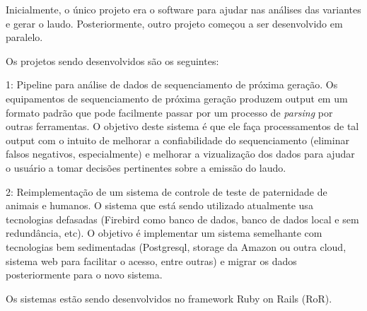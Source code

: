﻿Inicialmente, o único projeto era o software para ajudar nas análises das variantes e gerar o laudo. Posteriormente, outro projeto começou a ser desenvolvido
em paralelo.

Os projetos sendo desenvolvidos são os seguintes:

1: Pipeline para análise de dados de sequenciamento de próxima geração. Os equipamentos de sequenciamento de próxima geração produzem output em 
um formato padrão que pode facilmente passar por um processo de \textit{parsing} por outras ferramentas. O objetivo deste sistema é que ele 
faça processamentos de tal output com o intuito de melhorar a confiabilidade do sequenciamento (eliminar falsos negativos, especialmente) 
e melhorar a vizualização dos dados para ajudar o usuário a tomar decisões pertinentes sobre a emissão do laudo.

2: Reimplementação de um sistema de controle de teste de paternidade de animais e humanos. O sistema que está sendo utilizado atualmente usa 
tecnologias defasadas (Firebird como banco de dados, banco de dados local e sem redundância, etc). O objetivo é implementar um sistema semelhante 
com tecnologias bem sedimentadas (Postgresql, storage da Amazon ou outra cloud, sistema web para facilitar o acesso, entre outras) e migrar 
os dados posteriormente para o novo sistema.

Os sistemas estão sendo desenvolvidos no framework Ruby on Rails (RoR). 


